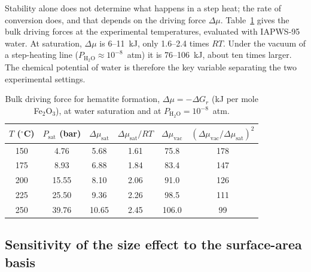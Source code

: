 Stability alone does not determine what happens in a step heat; the rate of conversion does,
and that depends on the driving force $\Delta\mu$. Table~\ref{tab:gtsi_dmu} gives the bulk driving
forces at the experimental temperatures, evaluated with IAPWS-95 water. At saturation,
$\Delta\mu$ is 6--11~kJ, only 1.6--2.4 times $RT$. Under the vacuum of a step-heating line
($P_{\mathrm{H_2O}}\approx10^{-8}$~atm) it is 76--106~kJ, about ten times larger. The chemical
potential of water is therefore the key variable separating the two experimental settings.

\begin{table}[htbp]
  \centering
  \caption{Bulk driving force for hematite formation, $\Delta\mu = -\Delta G_r$ (kJ per mole Fe$_2$O$_3$), at water saturation and at $P_{\mathrm{H_2O}} = 10^{-8}$~atm.}
  \label{tab:gtsi_dmu}
  \begin{tabular}{cccccc}
    \hline
    $T$ ($^\circ$C) & $P_{\mathrm{sat}}$ (bar) & $\Delta\mu_{\mathrm{sat}}$ & $\Delta\mu_{\mathrm{sat}}/RT$ & $\Delta\mu_{\mathrm{vac}}$ & $(\Delta\mu_{\mathrm{vac}}/\Delta\mu_{\mathrm{sat}})^2$ \\
    \hline
    150 & 4.76  & 5.68  & 1.61 & 75.8  & 178 \\
    175 & 8.93  & 6.88  & 1.84 & 83.4  & 147 \\
    200 & 15.55 & 8.10  & 2.06 & 91.0  & 126 \\
    225 & 25.50 & 9.36  & 2.26 & 98.5  & 111 \\
    250 & 39.76 & 10.65 & 2.45 & 106.0 & 99  \\
    \hline
  \end{tabular}
\end{table}

\subsection{Sensitivity of the size effect to the surface-area basis}
\label{sec:gtsi_supp_basis}

